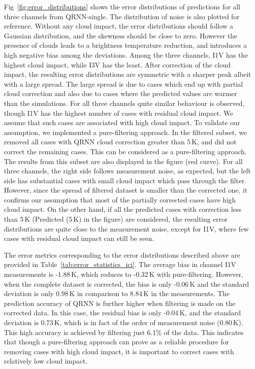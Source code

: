 \documentclass[amt, manuscript]{copernicus}
\begin{document}
Fig~\ref{fig:error_distributions} shows the error distributions of predictions for all three channels from QRNN-single. The distribution of noise is also plotted for reference. Without any cloud impact, the error distributions should follow a Gaussian distribution, and the skewness should be close to zero. However the presence of clouds leads to a brightness temperature reduction, and introduces a high negative bias among the deviations. Among the three channels, I1V has the highest cloud impact, while I3V has the least. After correction of the cloud impact, the resulting error distributions are  symmetric with a sharper peak albeit with a large spread. The large spread is due to cases which end up with partial cloud correction and also due to cases where the predicted values are warmer than the simulations. For all three channels quite similar behaviour is observed, though I1V has the highest number of cases with residual cloud impact. We assume that such cases are associated with high cloud impact. To validate our assumption, we implemented a pure-filtering approach. In the filtered subset, we removed all cases with QRNN cloud correction greater than 5\,K, and did not correct the remaining cases. This can be considered as a pure-filtering approach. The results from this subset are also displayed in the figure (red curve). For all three channels, the right side follows measurement noise, as expected, but the left side has substantial cases with small cloud impact which pass through the filter. However, since the spread of filtered dataset is smaller than the corrected one, it confirms our assumption that most of the partially corrected cases have high cloud impact. On the other hand, if all the predicted cases with correction less than 5\,K (Predicted (5\,K) in the figure) are considered, the resulting error distributions are quite close to the measurement noise, except for I1V, where few cases with residual cloud impact can still be seen. 

The error metrics corresponding to the error distributions described above are provided in Table~\ref{tab:error_statistics_ici}. The average bias in channel I1V measurements is -1.88\,K, which reduces to -0.32\,K with pure-filtering. However, when the complete dataset is corrected, the bias is only -0.06\,K and the standard deviation is only 0.98\,K in comparison to 8.84\,K in the measurements.  The prediction accuracy of QRNN is further higher when filtering is made on the corrected data. In this case, the residual bias is only -0.04\,K, and the standard deviation is 0.73\,K, which is in fact of the order of measurement noise (0.80\,K). This high accuracy is achieved by filtering just 6.1\% of the data. This indicates that though a pure-filtering approach can prove as a reliable procedure for removing cases with high cloud impact, it is important to correct cases with relatively low cloud impact. 
\end{document}
